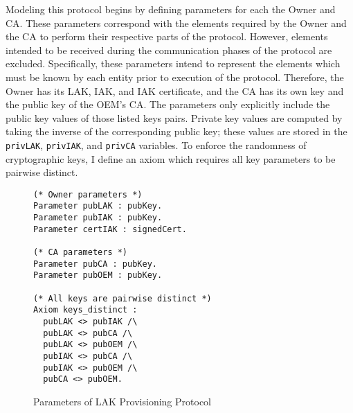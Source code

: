 Modeling this protocol begins by defining parameters for each the Owner and CA. These parameters correspond with the elements required by the Owner and the CA to perform their respective parts of the protocol. However, elements intended to be received during the communication phases of the protocol are excluded. Specifically, these parameters intend to represent the elements which must be known by each entity prior to execution of the protocol. Therefore, the Owner has its LAK, IAK, and IAK certificate, and the CA has its own key and the public key of the OEM's CA. The parameters only explicitly include the public key values of those listed keys pairs. Private key values are computed by taking the inverse of the corresponding public key; these values are stored in the \verb|privLAK|, \verb|privIAK|, and \verb|privCA| variables. To enforce the randomness of cryptographic keys, I define an axiom which requires all key parameters to be pairwise distinct. 
\begin{figure}[h]
\begin{lstlisting}[language=Coq]
(* Owner parameters *)
Parameter pubLAK : pubKey.
Parameter pubIAK : pubKey.
Parameter certIAK : signedCert.

(* CA parameters *)
Parameter pubCA : pubKey.
Parameter pubOEM : pubKey.

(* All keys are pairwise distinct *)
Axiom keys_distinct :
  pubLAK <> pubIAK /\
  pubLAK <> pubCA /\
  pubLAK <> pubOEM /\
  pubIAK <> pubCA /\
  pubIAK <> pubOEM /\
  pubCA <> pubOEM.
\end{lstlisting}
\caption{Parameters of LAK Provisioning Protocol}
\end{figure}

